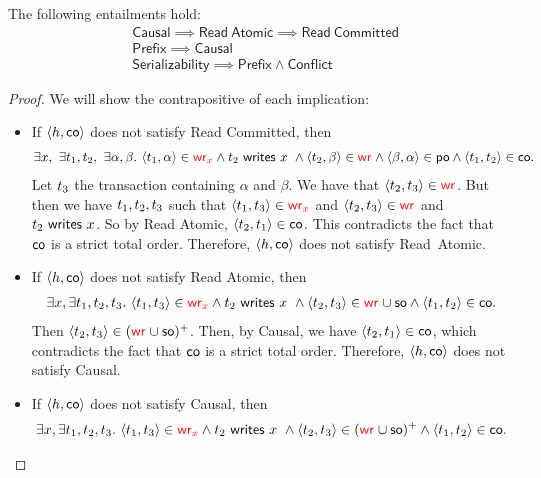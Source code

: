 \begin{lemma}
 The following entailments hold:
 \begin{align*}
   & \mathsf{Causal} \implies \mathsf{Read\ Atomic}\implies \mathsf{Read\ Committed} \\
   & \mathsf{Prefix} \implies \mathsf{Causal}                                        \\
   & \mathsf{Serializability} \implies \mathsf{Prefix}\land \mathsf{Conflict}        
 \end{align*} 
\end{lemma}
\begin{proof}
  We will show the contrapositive of each implication:
 \begin{itemize}
   \item If $\tup{\hist, \co}$ does not satisfy \textsf{Read Committed},  then
\begin{align*}
\exists \xvar,\ \exists \tr_1,\tr_2,\ \exists \alpha,\beta.\ \tup{\tr_1,\alpha}\in \wro[\xvar] \land \writeVar{\tr_2}{\xvar}\ \land \tup{\tr_2,\beta}\in\wro \land \tup{\beta,\alpha} \in \po \land \tup{\tr_1,\tr_2}\in\co. 
\end{align*}
Let $\tr_3$ the transaction containing $\alpha$ and $\beta$. We have that $\tup{\tr_2, \tr_3} \in \wro$. But then we have $\tr_1, \tr_2, \tr_3$ such that $\tup{\tr_1, \tr_3} \in \wro[\xvar]$ and $\tup{\tr_2, \tr_3} \in \wro$ and $\writeVar{\tr_2}{\xvar}$. So by \textsf{Read Atomic}, $\tup{\tr_2, \tr_1} \in \co$. This contradicts the fact that $\co$ is a strict total order. Therefore, $\tup{\hist, \co}$ does not satisfy \textsf{Read\ Atomic}.
   \item If $\tup{\hist, \co}$ does not satisfy \textsf{Read Atomic}, then 
 \begin{align*}  
 \exists \xvar, \exists \tr_1,\tr_2,\tr_3.\ \tup{\tr_1,\tr_3}\in \wro[\xvar] \land \writeVar{\tr_2}{\xvar}\ \land \tup{\tr_2,\tr_3}\in\wro\cup\so \land \tup{\tr_1,\tr_2}\in\co.
 \end{align*}
  Then $\tup{\tr_2,\tr_3}\in(\wro\cup\so)^+$. Then, by \textsf{Causal}, we have $\tup{\tr_2, \tr_1} \in \co$, which contradicts the fact that $\co$ is a strict total order. Therefore, $\tup{\hist, \co}$ does not satisfy \textsf{Causal}.
   \item If $\tup{\hist, \co}$ does not satisfy \textsf{Causal}, then
\begin{align*}
\exists \xvar, \exists \tr_1,\tr_2,\tr_3.\ \tup{\tr_1,\tr_3}\in \wro[\xvar] \land \writeVar{\tr_2}{\xvar}\ \land \tup{\tr_2,\tr_3}\in(\wro\cup\so)^+ \land\tup{\tr_1,\tr_2}\in\co.

\end{align*}
\end{itemize}
\end{proof}
